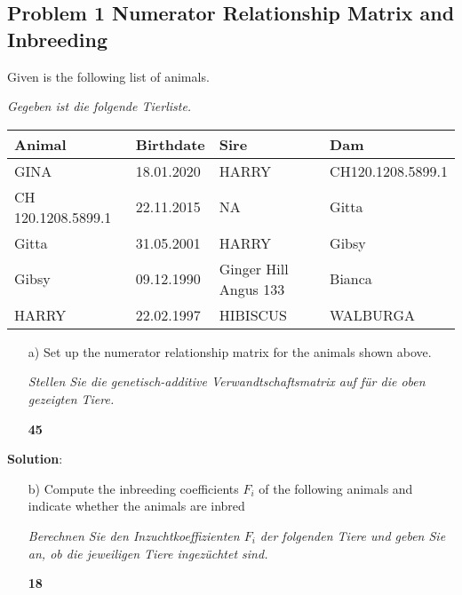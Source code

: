 \documentclass[
]{article}
\newcommand{\points}[1]
{\begin{flushright}\textbf{#1}\end{flushright}}
\newcommand{\solstart}
{\vspace{3ex}\textbf{Solution}:}
\begin{document}
\clearpage
\pagebreak

\hypertarget{problem-1-numerator-relationship-matrix-and-inbreeding}{%
\subsection{Problem 1 Numerator Relationship Matrix and
Inbreeding}\label{problem-1-numerator-relationship-matrix-and-inbreeding}}

\vspace{3ex}

Given is the following list of animals.

\vspace{3ex}

\textit{Gegeben ist die folgende Tierliste.}

\begin{tabular}{llll}
\toprule
Animal & Birthdate & Sire & Dam\\
\midrule
GINA & 18.01.2020 & HARRY & CH120.1208.5899.1\\
CH 120.1208.5899.1 & 22.11.2015 & NA & Gitta\\
Gitta & 31.05.2001 & HARRY & Gibsy\\
Gibsy & 09.12.1990 & Ginger Hill Angus 133 & Bianca\\
HARRY & 22.02.1997 & HIBISCUS & WALBURGA\\
\bottomrule
\end{tabular}

\vspace{3ex}
\begin{enumerate}
\item[a)] Set up the numerator relationship matrix for the animals shown above.

\textit{Stellen Sie die genetisch-additive Verwandtschaftsmatrix auf für die oben gezeigten Tiere.}
\points{45}
\end{enumerate}

\solstart

\clearpage
\pagebreak

\begin{enumerate}
\item[b)] Compute the inbreeding coefficients $F_i$ of the following animals and indicate whether the animals are inbred

\textit{Berechnen Sie den Inzuchtkoeffizienten $F_i$ der folgenden Tiere und geben Sie an, ob die jeweiligen Tiere ingezüchtet sind.}
\points{18}
\end{enumerate}
\end{document}
